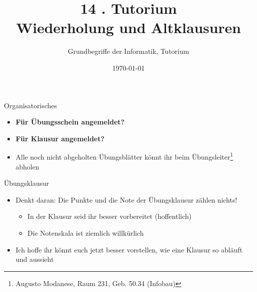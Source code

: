 




\title[\Moritz{Reguläre Sprachen und }Wiederholung]{14 . Tutorium\\ Wiederholung und Altklausuren}
\subtitle{Grundbegriffe der Informatik, Tutorium \hashtag\mytutnumber}
\date{\today}


\titleframe

\begin{frame}{Organisatorisches}
	\begin{itemize}
		\item \textbf{Für Übungsschein angemeldet?}
		\item \textbf{Für Klausur angemeldet?}
		\item Alle noch nicht abgeholten Übungsblätter könnt ihr beim Übungsleiter\footnote{Augusto Modanese, Raum 231, Geb. 50.34 (Infobau)} abholen
	\end{itemize}
\end{frame}


\begin{frame}{Übungsklausur}
	\begin{itemize}
		\item Denkt daran: Die Punkte und die Note der Übungsklausur zählen nichts!\begin{itemize}
			\item In der Klausur seid ihr besser vorbereitet (hoffentlich)
			\item Die Notenskala ist ziemlich willkürlich
		\end{itemize}
		\item Ich hoffe ihr könnt euch jetzt besser vorstellen, wie eine Klausur so abläuft und aussieht
	\end{itemize}
\end{frame}


\roadmap



